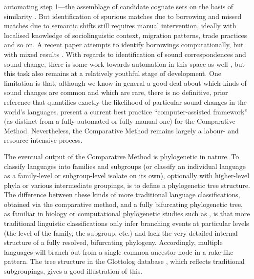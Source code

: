 automating step 1---the assemblage of candidate cognate sets on the basis of similarity \autocites{list_potential_2017}{rama_are_2018}{list_sequence_2018}. But identification of spurious matches due to borrowing and missed matches due to semantic shifts still requires manual intervention, ideally with localised knowledge of sociolinguistic context, migration patterns, trade practices and so on. A recent paper attempts to identify borrowings computationally, but with mixed results \autocite{miller_using_2020}. With regards to identification of sound correspondences and sound change, there is some work towards automation in this space as well \autocites{steiner_pipeline_2011}{brown_sound_2013}{bouchard-cote_automated_2013}{hruschka_detecting_2015}{list_automatic_2018}, but this task also remains at a relatively youthful stage of development. One limitation is that, although we know in general a good deal about which kinds of sound changes are common and which are rare, there is no definitive, prior reference that quantifies exactly the likelihood of particular sound changes in the world's languages. \textcite{wu_computer-assisted_2020} present a current best practice ``computer-assisted framework'' (as distinct from a fully automated or fully manual one) for the Comparative Method. Nevertheless, the Comparative Method remains largely a labour- and resource-intensive process.

The eventual output of the Comparative Method is phylogenetic in nature. To classify languages into families and subgroups (or classify an individual language as a family-level or subgroup-level isolate on its own), optionally with higher-level phyla or various intermediate groupings, is to define a phylogenetic tree structure. The difference between these kinds of more traditional language classifications, obtained via the comparative method, and a fully bifurcating phylogenetic tree, as familiar in biology or computational phylogenetic studies such as \textcite{bowern_computational_2012}, is that more traditional linguistic classifications only infer branching events at particular levels (the level of the family, the subgroup, etc.) and lack the very detailed internal structure of a fully resolved, bifurcating phylogeny. Accordingly, multiple languages will branch out from a single common ancestor node in a rake-like pattern. The tree structure in the Glottolog database \autocite{hammarstrom_glottolog_2020}, which reflects traditional subgroupings, gives a good illustration of this.

